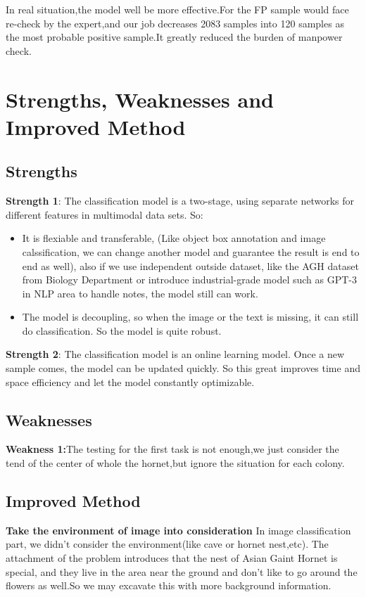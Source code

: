 \documentclass[12pt]{article}
\begin{document}
In real situation,the model well be more effective.For the FP sample would face re-check by the expert,and our job decreases 2083 samples into 120 samples as the most probable positive sample.It greatly reduced the burden of manpower check.


\section{Strengths, Weaknesses and Improved Method}
\subsection{Strengths}
\textbf{Strength 1}: The classification model is a two-stage, using separate networks for different features in multimodal data sets. So:
\begin{itemize}
	\item  It is flexiable and transferable, (Like object box annotation and image calssification, we can change another model and guarantee the result is end to end as well), also if we use independent outside dataset, like the AGH dataset from Biology Department or introduce industrial-grade model such as GPT-3 in NLP area to handle notes, the model still can work.
	\item  The model is decoupling, so when the image or the text is missing, it can still do classification. So the model is quite robust.
\end{itemize}

\textbf{Strength 2}: The classification model is an online learning model. Once a new sample comes, the model can be updated quickly. So this great improves time and space efficiency and let the model constantly optimizable.

\subsection{Weaknesses}
\textbf{Weakness 1:}The testing for the first task is not enough,we just consider the tend of the center of whole the hornet,but ignore the situation for each colony.

\subsection{Improved Method}
\textbf{Take the environment of image into consideration}
In image classification part, we didn't consider the environment(like cave or hornet nest,etc). The attachment of the problem introduces that the nest of Asian Gaint Hornet is special, and they live in the area near the ground and don't like to go around the flowers as well.So we may excavate this with more background information.
\end{document}
